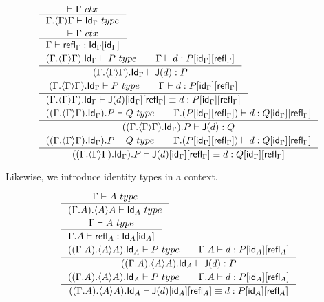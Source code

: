 \begin{align}
& \inference{\jctx{\Gamma}}{\jtype{\ctxext{\Gamma}{\ctxwk{\Gamma}{\Gamma}}}{\idtypevar{\Gamma}}}\\
& \inference{\jctx{\Gamma}}{\jterm{\Gamma}{\subst{\idfunc[\Gamma]}{\idtypevar{\Gamma}}}{\refl{\Gamma}}}\\
& \inference{\jtype{\ctxext{{\Gamma}{\ctxwk{\Gamma}{\Gamma}}}{\idtypevar{\Gamma}}}{P}
           \qquad
           \jterm{\Gamma}{\subst{\refl{\Gamma}}{{\idfunc[\Gamma]}{P}}}{d}}
           {\jterm{\ctxext{{\Gamma}{\ctxwk{\Gamma}{\Gamma}}}{\idtypevar{\Gamma}}}{P}{\tfJ(d)}}\\
& \inference{\jtype{\ctxext{{\Gamma}{\ctxwk{\Gamma}{\Gamma}}}{\idtypevar{\Gamma}}}{P}\qquad
\jterm{\Gamma}{\subst{\refl{\Gamma}}{{\idfunc[\Gamma]}{P}}}{d}}
{\jtermeq
  {\ctxext{{\Gamma}{\ctxwk{\Gamma}{\Gamma}}}{\idtypevar{\Gamma}}}
  {\subst{\refl{\Gamma}}{{\idfunc[\Gamma]}{P}}}
  {\subst{\refl{\Gamma}}{{\idfunc[\Gamma]}{\tfJ(d)}}}
  {d}}\\
& \inference{\jtype{\ctxext{{{\Gamma}{\ctxwk{\Gamma}{\Gamma}}}{\idtypevar{\Gamma}}}{P}}{Q}
           \qquad
           \jterm{\ctxext{\Gamma}{\subst{\refl{\Gamma}}{{\idfunc[\Gamma]}{P}}}}{\subst{\refl{\Gamma}}{{\idfunc[\Gamma]}{Q}}}{d}}
           {\jterm{\ctxext{{{\Gamma}{\ctxwk{\Gamma}{\Gamma}}}{\idtypevar{\Gamma}}}{P}}{Q}{\tfJ(d)}}\\
& \inference
  {\jtype
    {\ctxext{{{\Gamma}{\ctxwk{\Gamma}{\Gamma}}}{\idtypevar{\Gamma}}}{P}}
    {Q}
  \qquad
  \jterm
    {\ctxext{\Gamma}{\subst{\refl{\Gamma}}{{\idfunc[\Gamma]}{P}}}}
    {\subst{\refl{\Gamma}}{{\idfunc[\Gamma]}{Q}}}
    {d}}
  {\jtermeq
    {\ctxext{{{\Gamma}{\ctxwk{\Gamma}{\Gamma}}}{\idtypevar{\Gamma}}}{P}}
    {\subst{\refl{\Gamma}}{{\idfunc[\Gamma]}{Q}}}
    {\subst{\refl{\Gamma}}{{\idfunc[\Gamma]}{\tfJ(d)}}}
    {d}}
\end{align}

Likewise, we introduce identity types in a context.

\begin{align}
& \inference{\jtype{\Gamma}{A}}{\jtype{\ctxext{{\Gamma}{A}}{\ctxwk{A}{A}}}{\idtypevar{A}}}\\
& \inference{\jtype{\Gamma}{A}}{\jterm{\ctxext{\Gamma}{A}}{\subst{\idfunc[A]}{\idtypevar{A}}}{\refl{A}}}\\
& \inference{\jtype{\ctxext{{{\Gamma}{A}}{\ctxwk{A}{A}}}{\idtypevar{A}}}{P}\qquad
\jterm{\ctxext{\Gamma}{A}}{\subst{\refl{A}}{{\idfunc[A]}{P}}}{d}}
{\jterm{\ctxext{{{\Gamma}{A}}{\ctxwk{A}{A}}}{\idtypevar{A}}}{P}{\tfJ(d)}}\\
& \inference{\jtype{\ctxext{{{\Gamma}{A}}{\ctxwk{A}{A}}}{\idtypevar{A}}}{P}\qquad
\jterm{\ctxext{\Gamma}{A}}{\subst{\refl{A}}{{\idfunc[A]}{P}}}{d}}
{\jtermeq
  {\ctxext{{{\Gamma}{A}}{\ctxwk{A}{A}}}{\idtypevar{A}}}
  {\subst{\refl{A}}{{\idfunc[A]}{P}}}
  {\subst{\refl{A}}{{\idfunc[A]}{\tfJ(d)}}}
  {d}}
\end{align}

